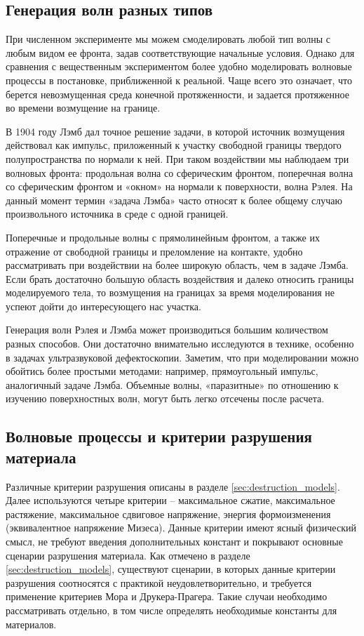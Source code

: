 \clearpage
\newpage


\subsection{Генерация волн разных типов}

При численном эксперименте мы можем смоделировать любой тип волны с любым видом ее фронта, задав соответствующие начальные условия. Однако для сравнения с вещественным экспериментом более удобно моделировать волновые процессы в постановке, приближенной к реальной. Чаще всего это означает, что берется невозмущенная среда конечной протяженности, и задается протяженное во времени возмущение на границе.

В 1904 году Лэмб дал точное решение задачи, в которой источник возмущения действовал как импульс, приложенный к участку свободной границы твердого полупространства по нормали к ней. При таком воздействии мы наблюдаем три волновых фронта: продольная волна со сферическим фронтом, поперечная волна со сферическим фронтом и «окном» на нормали к поверхности, волна Рэлея. На данный момент термин «задача Лэмба» часто относят к более общему случаю произвольного источника в среде с одной границей.

Поперечные и продольные волны с прямолинейным фронтом, а также их отражение от свободной границы и преломление на контакте, удобно рассматривать при воздействии на более широкую область, чем в задаче Лэмба. Если брать достаточно большую область воздействия и далеко относить границы моделируемого тела, то возмущения на границах за время моделирования не успеют дойти до интересующего нас участка.

Генерация волн Рэлея и Лэмба может производиться большим количеством разных способов. Они достаточно внимательно исследуются в технике, особенно в задачах ультразвуковой дефектоскопии. Заметим, что при моделировании можно обойтись более простыми методами: например, прямоугольный импульс, аналогичный задаче Лэмба. Объемные волны, «паразитные» по отношению к изучению поверхностных волн, могут быть легко отсечены после расчета.

\clearpage
\newpage


\subsection{Волновые процессы и критерии разрушения материала}

Различные критерии разрушения описаны в разделе \ref{sec:destruction_models}. Далее используются четыре критерии -- максимальное сжатие, максимальное растяжение, максимальное сдвиговое напряжение, энергия формоизменения (эквивалентное напряжение Мизеса). Данные критерии имеют ясный физический смысл, не требуют введения дополнительных констант и покрывают основные сценарии разрушения материала. Как отмечено в разделе \ref{sec:destruction_models}, существуют сценарии, в которых данные критерии разрушения соотносятся с практикой неудовлетворительно, и требуется применение критериев Мора и Друкера-Прагера. Такие случаи необходимо рассматривать отдельно, в том числе определять необходимые константы для материалов.

